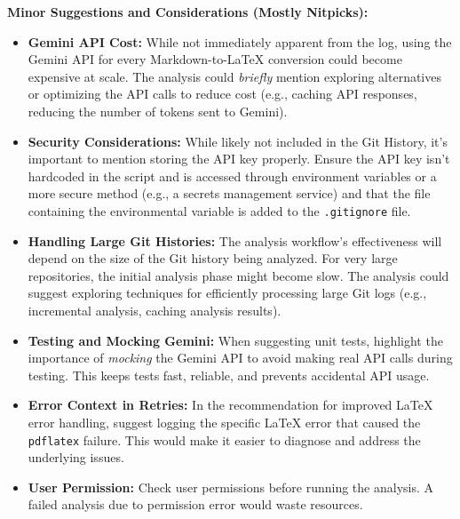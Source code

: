 \documentclass{article}
\begin{document}
\begin{itemize}
\begin{itemize}
\begin{itemize}
           \textbf{Minor Suggestions and Considerations (Mostly Nitpicks):}
            \begin{itemize}
                \item \textbf{Gemini API Cost:} While not immediately apparent from the log, using the Gemini API for every Markdown-to-LaTeX conversion could become expensive at scale. The analysis could \textit{briefly} mention exploring alternatives or optimizing the API calls to reduce cost (e.g., caching API responses, reducing the number of tokens sent to Gemini).
                \item \textbf{Security Considerations:} While likely not included in the Git History, it's important to mention storing the API key properly. Ensure the API key isn't hardcoded in the script and is accessed through environment variables or a more secure method (e.g., a secrets management service) and that the file containing the environmental variable is added to the \texttt{.gitignore} file.
                \item \textbf{Handling Large Git Histories:} The analysis workflow's effectiveness will depend on the size of the Git history being analyzed. For very large repositories, the initial analysis phase might become slow. The analysis could suggest exploring techniques for efficiently processing large Git logs (e.g., incremental analysis, caching analysis results).
                \item \textbf{Testing and Mocking Gemini:} When suggesting unit tests, highlight the importance of \textit{mocking} the Gemini API to avoid making real API calls during testing. This keeps tests fast, reliable, and prevents accidental API usage.
                \item \textbf{Error Context in Retries:} In the recommendation for improved LaTeX error handling, suggest logging the specific LaTeX error that caused the \texttt{pdflatex} failure. This would make it easier to diagnose and address the underlying issues.
                \item \textbf{User Permission:} Check user permissions before running the analysis. A failed analysis due to permission error would waste resources.
            \end{itemize}


\end{itemize}
\end{itemize}
\end{itemize}
\end{document}
